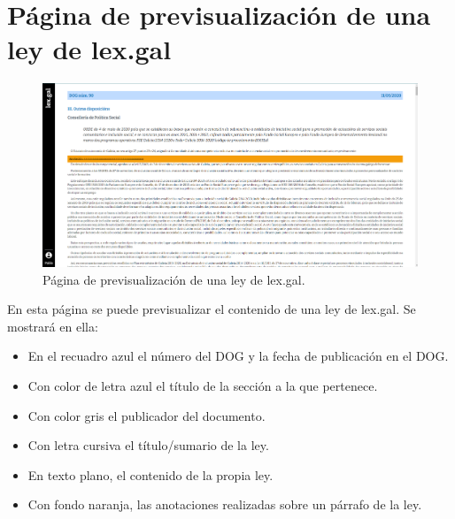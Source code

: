 \section{Página de previsualización de una ley de lex.gal}
\label{PPrevisualizacionLexGal}

\begin{figure}[H]
\centerline{\includegraphics[width=15cm]{figuras/manualUsuario/PrevisualizarLEXGAL.PNG}}
\caption{Página de previsualización de una ley de lex.gal.}
\label{enlacePrevisualizacionLexGal}
\end{figure}

En esta página se puede previsualizar el contenido de una ley de lex.gal. Se mostrará en ella:
\begin{itemize}
    \item En el recuadro azul el número del DOG y la fecha de publicación en el DOG.
    \item Con color de letra azul el título de la sección a la que pertenece.
    \item Con color gris el publicador del documento.
    \item Con letra cursiva el título/sumario de la ley.
    \item En texto plano, el contenido de la propia ley.
    \item Con fondo naranja, las anotaciones realizadas sobre un párrafo de la ley.
\end{itemize}